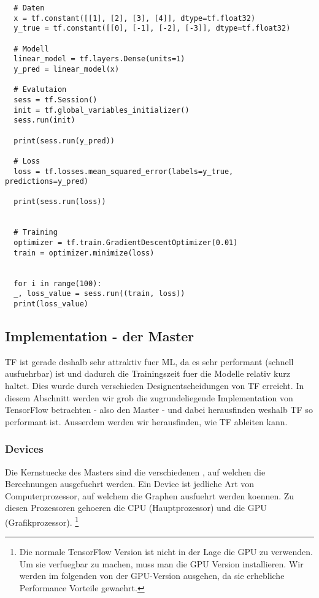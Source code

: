\begin{verbatim}
  # Daten
  x = tf.constant([[1], [2], [3], [4]], dtype=tf.float32)
  y_true = tf.constant([[0], [-1], [-2], [-3]], dtype=tf.float32)

  # Modell
  linear_model = tf.layers.Dense(units=1)
  y_pred = linear_model(x)

  # Evalutaion
  sess = tf.Session()
  init = tf.global_variables_initializer()
  sess.run(init)

  print(sess.run(y_pred))

  # Loss
  loss = tf.losses.mean_squared_error(labels=y_true, predictions=y_pred)

  print(sess.run(loss))


  # Training
  optimizer = tf.train.GradientDescentOptimizer(0.01)
  train = optimizer.minimize(loss)


  for i in range(100):
  _, loss_value = sess.run((train, loss))
  print(loss_value)

\end{verbatim}


\subsection{Implementation - der Master}
TF ist gerade deshalb sehr attraktiv fuer ML, da es sehr performant (schnell
ausfuehrbar) ist und dadurch die Trainingszeit fuer die Modelle relativ
kurz haltet. Dies wurde durch verschieden Designentscheidungen von TF erreicht.
\para{}
In diesem Abschnitt werden wir grob die zugrundeliegende Implementation von
TensorFlow betrachten - also den Master - und dabei herausfinden weshalb TF so performant ist.
Ausserdem werden wir herausfinden, wie TF ableiten kann.


\subsubsection{Devices}
Die Kernstuecke des Masters sind die verschiedenen , auf
welchen die Berechnungen ausgefuehrt werden. Ein Device ist jedliche Art von
Computerprozessor, auf welchem die Graphen ausfuehrt werden koennen.
Zu diesen Prozessoren gehoeren die CPU (Hauptprozessor) und die GPU (Grafikprozessor).
\footnote{
Die normale TensorFlow Version ist nicht in der Lage die GPU zu verwenden. Um
sie verfuegbar zu machen, muss man die GPU Version installieren. Wir werden im folgenden
von der GPU-Version ausgehen, da sie erhebliche Performance Vorteile gewaehrt.
}
\para{}

